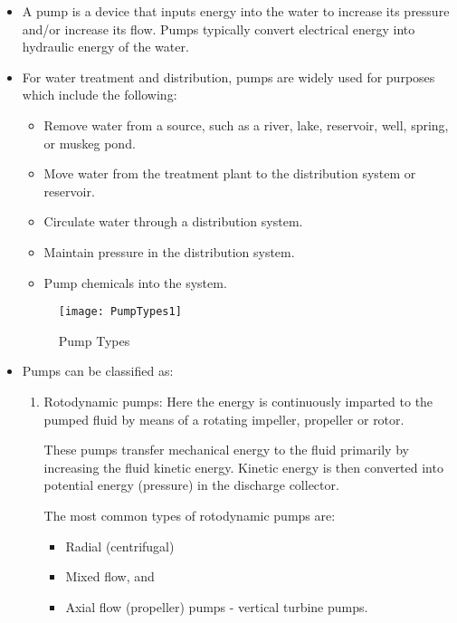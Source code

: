 \begin{itemize}
  \setlength\itemsep{1em}
\item A pump is a device that inputs energy into the water to increase its pressure and/or increase its flow.  Pumps typically convert electrical energy into hydraulic energy of the water.  

\item For water treatment and distribution, pumps are widely used for purposes which include the following:

\begin{itemize}
  \item Remove water from a source, such as a river, lake, reservoir, well, spring, or muskeg pond.

  \item Move water from the treatment plant to the distribution system or reservoir.

  \item Circulate water through a distribution system.

  \item Maintain pressure in the distribution system.

  \item Pump chemicals into the system.

\end{itemize}

\begin{figure}[H]
\begin{center}
\texttt{[image: PumpTypes1]}
\caption{Pump Types}
\end{center}
\end{figure}


\item Pumps can be classified as: 
\begin{enumerate}
\item Rotodynamic pumps:  Here the energy is continuously imparted to the pumped fluid by means of a rotating impeller, propeller or rotor. 



These pumps transfer mechanical energy to the fluid primarily by increasing the fluid kinetic energy. Kinetic energy is then converted into potential energy (pressure) in the discharge collector. 

\vspace{0.2cm}

The most common types of rotodynamic pumps are:
\begin{itemize}
\item Radial (centrifugal)
\item Mixed flow, and 
\item Axial flow (propeller) pumps - vertical turbine pumps.
\end{itemize}


\end{enumerate}
\end{itemize}
